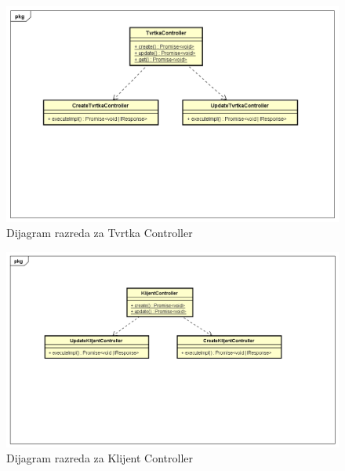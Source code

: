 		\begin{figure}[H]
			\includegraphics[width=1\linewidth]{dijagrami/Dijagram razreda - TvrtkaController.png}
			\caption{Dijagram razreda za Tvrtka Controller}
			\label{fig:Dijagram razreda - TvrtkaController} 
		\end{figure}
		
		\begin{figure}[H]
			\includegraphics[width=1\linewidth]{dijagrami/Dijagram razreda - KlijentController.png}
			\caption{Dijagram razreda za Klijent Controller}
			\label{fig:Dijagram razreda - KlijentController} 
		\end{figure}
		

